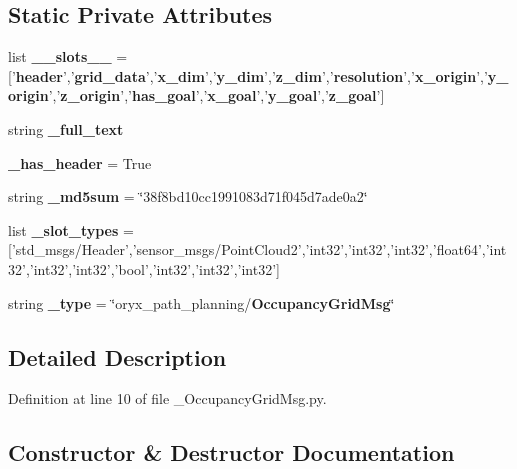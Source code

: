 \subsection*{\-Static \-Private \-Attributes}
\begin{DoxyCompactItemize}
\item 
list {\bf \-\_\-\-\_\-slots\-\_\-\-\_\-} = ['{\bf header}','{\bf grid\-\_\-data}','{\bf x\-\_\-dim}','{\bf y\-\_\-dim}','{\bf z\-\_\-dim}','{\bf resolution}','{\bf x\-\_\-origin}','{\bf y\-\_\-origin}','{\bf z\-\_\-origin}','{\bf has\-\_\-goal}','{\bf x\-\_\-goal}','{\bf y\-\_\-goal}','{\bf z\-\_\-goal}']
\item 
string {\bf \-\_\-full\-\_\-text}
\item 
{\bf \-\_\-has\-\_\-header} = \-True
\item 
string {\bf \-\_\-md5sum} = \char`\"{}38f8bd10cc1991083d71f045d7ade0a2\char`\"{}
\item 
list {\bf \-\_\-slot\-\_\-types} = ['std\-\_\-msgs/\-Header','sensor\-\_\-msgs/\-Point\-Cloud2','int32','int32','int32','float64','int32','int32','int32','bool','int32','int32','int32']
\item 
string {\bf \-\_\-type} = \char`\"{}oryx\-\_\-path\-\_\-planning/{\bf \-Occupancy\-Grid\-Msg}\char`\"{}
\end{DoxyCompactItemize}


\subsection{\-Detailed \-Description}


\-Definition at line 10 of file \-\_\-\-Occupancy\-Grid\-Msg.\-py.



\subsection{\-Constructor \& \-Destructor \-Documentation}
